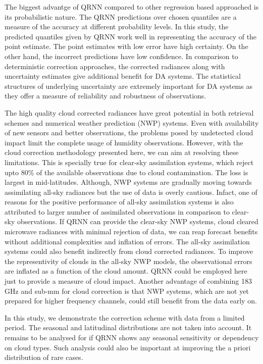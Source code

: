 \documentclass[amt, manuscript]{copernicus}
\begin{document}
The biggest advantge of QRNN compared to other regression based approached is its probabilistic nature. The QRNN predictions over chosen quantiles are a measure of the accuracy at different probability levels. In this study, the predicted quantiles given by QRNN work well in representing the accuracy of the point estimate. The point estimates with low error have high certainty. On the other hand, the  incorrect predictions have low confidence. In comparison to deterministic correction approaches, the corrected radiances along with uncertainty estimates give additional benefit for DA systems. The statistical structures of underlying uncertainty are extremely important for DA systems as they offer a measure of reliability and robustness of observations.

The high quality cloud corrected radiances have great potential in both retrieval schemes and numerical weather prediction (NWP) systems. Even with availability of new sensors and better observations, the problems posed by undetected cloud impact limit the complete usage of humidity observations. However, with the cloud correction methodology presented here, we can aim at resolving these limitations. This is specially true for clear-sky assimilation systems, which reject upto 80\% of the available observations due to cloud contamination. The loss is largest in mid-latitudes. Although, NWP systems are gradually moving towards assimilating all-sky radiances but the use of data is overly cautious. Infact, one of reasons for the positive performance of all-sky assimilation systems is also attributed to larger number of assimilated observations in comparison to clear-sky observations. If QRNN can provide the clear-sky NWP systems, cloud cleared microwave radiances with minimal rejection of data, we can reap forecast benefits without  additional complexities and inflation of errors. The all-sky assimilation systems could also benefit indirectly from cloud corrected radiances. To improve the representivity of clouds in the all-sky NWP models, the observational errors are inflated as a function of the cloud amount. QRNN could be employed here just to provide a measure of cloud impact. Another advantage of combining 183\,GHz and sub-mm for cloud correction is that NWP systems, which are not yet prepared for higher frequency channels, could still benefit from the data early on. 

In this study, we demonstrate the correction scheme with data from a limited period. The seasonal and latitudinal distributions are not taken into account. It remains to be  analysed for if QRNN shows any seasonal sensitivity or dependency on cloud types. Such analysis could also be important at improving the a priori distribution of rare cases. 
\end{document}
